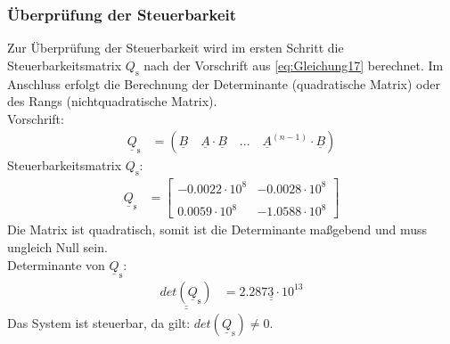 \subsubsection{Überprüfung der Steuerbarkeit}
\label{sec:Ueberpruefung_der_Steuerbarkeit}
Zur Überprüfung der Steuerbarkeit wird im ersten Schritt die Steuerbarkeitsmatrix $Q_{\mathrm{s}}$ nach der Vorschrift aus \autoref{eq:Gleichung17} berechnet. Im Anschluss erfolgt die Berechnung der Determinante (quadratische Matrix) oder des Rangs (nichtquadratische Matrix).\\
\newline
Vorschrift:
\begin{align}
    \underline{Q}_{\mathrm{s}} &= \left(\underline{B} \quad \underline{A}\cdot\underline{B} \quad ... \quad \underline{A}^{(n-1)}\cdot\underline{B}\right)
    \label{eq:Gleichung17}
\end{align}
Steuerbarkeitsmatrix $Q_{\mathrm{s}}$:
\begin{align}
    \underline{Q}_{\mathrm{s}} &=
    \begin{bmatrix}
        -0.0022\cdot 10^8 & -0.0028\cdot 10^8 \\\\
        0.0059\cdot 10^8 & -1.0588\cdot 10^8
    \end{bmatrix}
    \label{eq:Gleichung18}
\end{align}
\newline
Die Matrix ist quadratisch, somit ist die Determinante maßgebend und muss ungleich Null sein.\\
\newline
Determinante von $\underline{Q}_{\mathrm{s}}$:
\begin{align*}
    \underline{\underline{det(\underline{Q}_{\mathrm{s}})}} &= \underline{\underline{ 2.2873\cdot 10^{13}}}
\end{align*}
\newline
Das System ist steuerbar, da gilt: $det(\underline{Q}_{\mathrm{s}}) \neq 0$.
